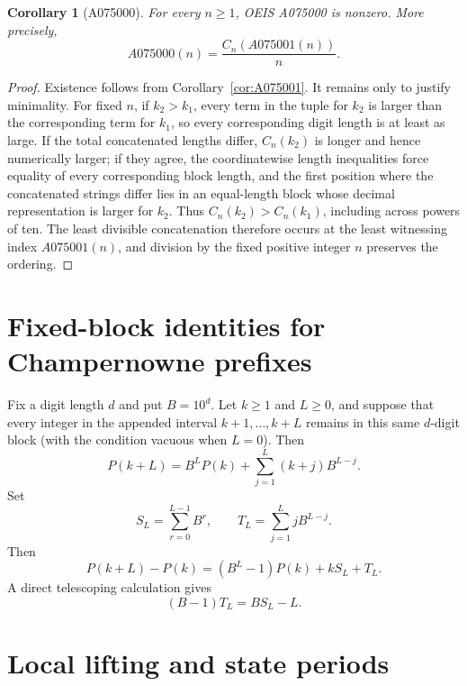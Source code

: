 \documentclass[11pt]{amsart}
\newtheorem{corollary}[theorem]{Corollary}
\theoremstyle{remark}
\begin{document}
\begin{corollary}[A075000]\label{cor:A075000}
For every \(n\ge1\), OEIS A075000 is nonzero.  More precisely,
\[
A075000(n)=\frac{C_n(A075001(n))}{n}.
\]
\end{corollary}

\begin{proof}
Existence follows from Corollary~\ref{cor:A075001}.  It remains only to justify minimality.
For fixed \(n\), if \(k_2>k_1\), every term in the tuple for \(k_2\) is larger than the
corresponding term for \(k_1\), so every corresponding digit length is at least as large.
If the total concatenated lengths differ, \(C_n(k_2)\) is longer and hence numerically
larger; if they agree, the coordinatewise length inequalities force equality of every
corresponding block length, and the first position where the concatenated strings differ
lies in an equal-length block whose decimal representation is larger for \(k_2\).
Thus \(C_n(k_2)>C_n(k_1)\), including across powers of ten.  The least divisible
concatenation therefore occurs at the least witnessing index \(A075001(n)\), and division
by the fixed positive integer \(n\) preserves the ordering.
\end{proof}

\section{Fixed-block identities for Champernowne prefixes}
\label{sec:fixed-block-identities}

Fix a digit length \(d\) and put \(B=10^d\).  Let \(k\ge1\) and \(L\ge0\), and suppose
that every integer in the appended interval \(k+1,\ldots,k+L\) remains in this same
\(d\)-digit block (with the condition vacuous when \(L=0\)).  Then
\begin{equation}\label{eq:block-transition}
P(k+L)
 =B^LP(k)+\sum_{j=1}^L(k+j)B^{L-j}.
\end{equation}
Set
\[
S_L=\sum_{r=0}^{L-1}B^r,
\qquad
T_L=\sum_{j=1}^LjB^{L-j}.
\]
Then
\begin{equation}\label{eq:shift-identity}
P(k+L)-P(k)
 =(B^L-1)P(k)+kS_L+T_L.
\end{equation}
A direct telescoping calculation gives
\begin{equation}\label{eq:geometric-T}
(B-1)T_L=BS_L-L.
\end{equation}

\section{Local lifting and state periods}
\label{sec:local-lifting}
\end{document}
